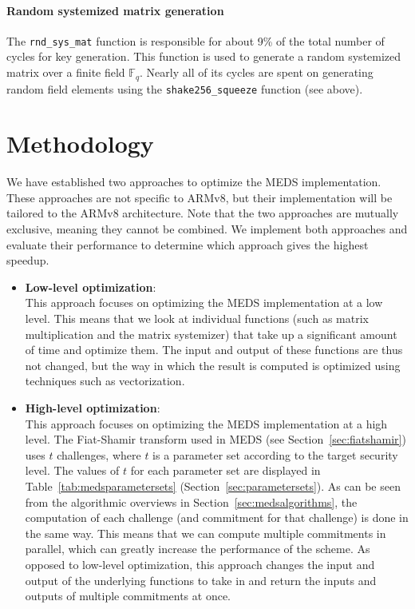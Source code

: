 \documentclass[11pt,a4paper]{report}
\theoremstyle{definition}
\begin{document}
\subsubsection{Random systemized matrix generation}
The \texttt{rnd\_sys\_mat} function is responsible for about 9\% of the total number of cycles for key generation. This function is used to generate a random systemized matrix over a finite field $\mathbb{F}_q$. Nearly all of its cycles are spent on generating random field elements using the \texttt{shake256\_squeeze} function (see above).

\chapter{Methodology}
\label{ch:methodology}
We have established two approaches to optimize the MEDS implementation. These approaches are not specific to ARMv8, but their implementation will be tailored to the ARMv8 architecture. Note that the two approaches are mutually exclusive, meaning they cannot be combined. We implement both approaches and evaluate their performance to determine which approach gives the highest speedup.
\begin{itemize}
  \item \textbf{Low-level optimization}:\\
        This approach focuses on optimizing the MEDS implementation at a low level. This means that we look at individual functions (such as matrix multiplication and the matrix systemizer) that take up a significant amount of time and optimize them. The input and output of these functions are thus not changed, but the way in which the result is computed is optimized using techniques such as vectorization.
  \item \textbf{High-level optimization}:\\
        This approach focuses on optimizing the MEDS implementation at a high level. The Fiat-Shamir transform used in MEDS (see Section~\ref{sec:fiatshamir}) uses $t$ challenges, where $t$ is a parameter set according to the target security level. The values of $t$ for each parameter set are displayed in Table~\ref{tab:medsparametersets} (Section~\ref{sec:parametersets}). As can be seen from the algorithmic overviews in Section~\ref{sec:medsalgorithms}, the computation of each challenge (and commitment for that challenge) is done in the same way. This means that we can compute multiple commitments in parallel, which can greatly increase the performance of the scheme. As opposed to low-level optimization, this approach changes the input and output of the underlying functions to take in and return the inputs and outputs of multiple commitments at once.
\end{itemize}
\end{document}

